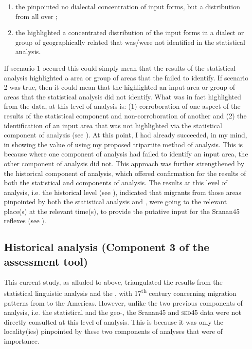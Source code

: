 {{{\begin{enumerate}
\item {the  pinpointed no dialectal concentration of input forms, but a distribution from all over ;}
\item{the  highlighted a concentrated distribution of the input forms in a dialect or group of geographically related  that was/were not identified in the statistical analysis.}
\end{enumerate}

If scenario 1 occured this could simply mean that the results of the statistical analysis highlighted a  area or group of areas that the  failed to identify. If scenario 2 was true, then it could mean that the  highlighted an input area or group of areas that the statistical analysis did not identify. What was in fact highlighted from the data, at this level of analysis is: (1) corroboration of one aspect of the results of the statistical component and non-corroboration of another and (2) the identification of an input area that was not highlighted via the statistical component of analysis (see ). At this point, I had already succeeded, in my mind, in showing the value of using my proposed tripartite method of analysis. This is because where one component of analysis had failed to identify an input area, the other component of analysis did not. This approach was further strengthened by the historical component of analysis, which offered confirmation for the results of both the statistical and  components of analysis. The results at this level of analysis, i.e. the historical level (see ), indicated that migrants from those areas pinpointed by both the statistical analysis and , were going to the relevant place(s) at the relevant time(s), to provide the putative input for the Sranan45 reflexes (see ).

\subsection{Historical analysis (Component 3 of the assessment tool)} \label{3.4.5}
This current study, as alluded to above, triangulated the results from the statistical linguistic analysis and the , with 17\textsuperscript{th} century  concerning migration patterns from  to the Americas. However, unlike the two previous components of analysis, i.e. the statistical and the geo-, the Sranan45 and \textsc{sed45} data were not directly consulted at this level of analysis. This is because it was only the locality(ies) pinpointed by these two components of analyses that were of importance.

}}}
